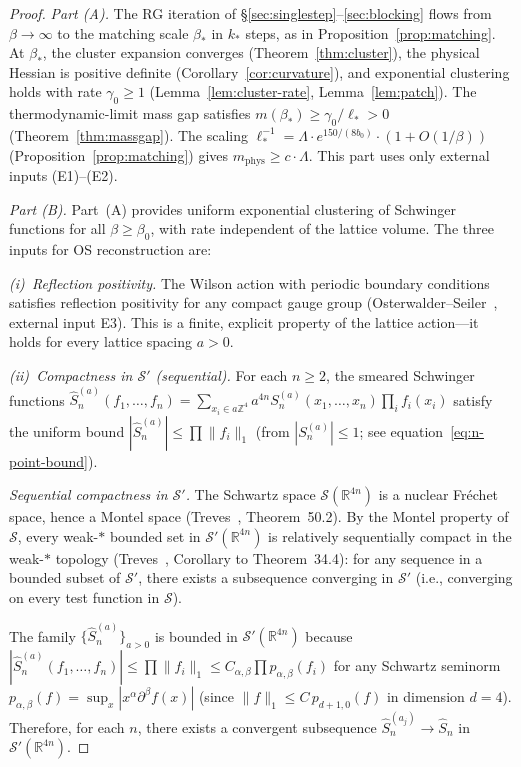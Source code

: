 \documentclass[11pt]{article}
\theoremstyle{definition}
\newcommand{\R}{\mathbb{R}}
\newcommand{\Z}{\mathbb{Z}}
\begin{document}
\begin{proof}
\emph{Part (A).}
The RG iteration of \S\ref{sec:singlestep}--\ref{sec:blocking}
flows from $\beta\to\infty$ to the matching scale $\beta_*$ in $k_*$
steps, as in Proposition~\ref{prop:matching}.  At $\beta_*$,
the cluster expansion converges (Theorem~\ref{thm:cluster}), the
physical Hessian is positive definite
(Corollary~\ref{cor:curvature}),
and exponential clustering holds with rate $\gamma_0\ge 1$
(Lemma~\ref{lem:cluster-rate}, Lemma~\ref{lem:patch}).
The thermodynamic-limit
mass gap satisfies
$m(\beta_*)\ge\gamma_0/\ell_*>0$ (Theorem~\ref{thm:massgap}).
The scaling $\ell_*^{-1}=\Lambda\cdot e^{150/(8b_0)}\cdot(1+O(1/\beta))$
(Proposition~\ref{prop:matching}) gives $m_{\mathrm{phys}}\ge c\cdot\Lambda$.
This part uses only external inputs (E1)--(E2).

\emph{Part (B).}
Part~(A) provides uniform exponential clustering of Schwinger
functions for all $\beta\ge\beta_0$, with rate independent of the
lattice volume.  The three inputs for OS reconstruction are:

\emph{(i)~Reflection positivity.}
The Wilson action with periodic boundary conditions satisfies
reflection positivity for any compact gauge group
(Osterwalder--Seiler~\cite{OS78}, external input E3).
This is a finite, explicit property of the lattice action---it
holds for every lattice spacing $a>0$.

\emph{(ii)~Compactness in $\mathcal{S}'$ (sequential).}
For each $n\ge 2$, the smeared Schwinger functions
$\hat S_n^{(a)}(f_1,\ldots,f_n)
=\sum_{x_i\in a\Z^4}a^{4n}S_n^{(a)}(x_1,\ldots,x_n)
\prod_i f_i(x_i)$
satisfy the uniform bound
$|\hat S_n^{(a)}|\le\prod\|f_i\|_1$
(from $|S_n^{(a)}|\le 1$; see equation~\eqref{eq:n-point-bound}).

\emph{Sequential compactness in $\mathcal{S}'$.}
The Schwartz space $\mathcal{S}(\R^{4n})$ is a nuclear
Fr\'echet space, hence a Montel space
(Treves~\cite{Treves}, Theorem~50.2).
By the Montel property of $\mathcal{S}$, every
weak-$*$ bounded set in $\mathcal{S}'(\R^{4n})$ is
relatively sequentially compact in the weak-$*$ topology
(Treves~\cite{Treves}, Corollary to Theorem~34.4):
for any sequence in a bounded subset of $\mathcal{S}'$,
there exists a subsequence converging in $\mathcal{S}'$
(i.e., converging on every test function in $\mathcal{S}$).

The family $\{\hat S_n^{(a)}\}_{a>0}$ is bounded in
$\mathcal{S}'(\R^{4n})$ because
$|\hat S_n^{(a)}(f_1,\ldots,f_n)|\le\prod\|f_i\|_1
\le C_{\alpha,\beta}\prod p_{\alpha,\beta}(f_i)$
for any Schwartz seminorm $p_{\alpha,\beta}(f)
=\sup_x|x^\alpha\partial^\beta f(x)|$
(since $\|f\|_1\le C\,p_{d+1,0}(f)$ in dimension $d=4$).
Therefore, for each $n$, there exists a convergent
subsequence $\hat S_n^{(a_j)}\to\hat S_n$ in
$\mathcal{S}'(\R^{4n})$.


\end{proof}
\end{document}
